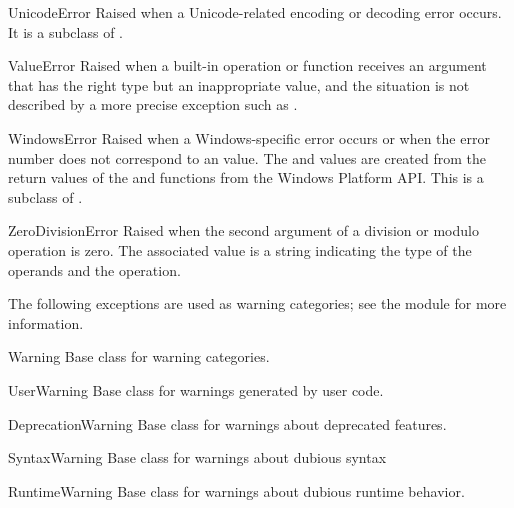 \begin{excdesc}{UnicodeError}
  Raised when a Unicode-related encoding or decoding error occurs.  It
  is a subclass of .
\end{excdesc}

\begin{excdesc}{ValueError}
  Raised when a built-in operation or function receives an argument
  that has the right type but an inappropriate value, and the
  situation is not described by a more precise exception such as
  .
\end{excdesc}

\begin{excdesc}{WindowsError}
  Raised when a Windows-specific error occurs or when the error number
  does not correspond to an  value.  The
   and  values are created from the
  return values of the  and
   functions from the Windows Platform API.
  This is a subclass of .
\end{excdesc}

\begin{excdesc}{ZeroDivisionError}
  Raised when the second argument of a division or modulo operation is
  zero.  The associated value is a string indicating the type of the
  operands and the operation.
\end{excdesc}



The following exceptions are used as warning categories; see the
 module for more information.

\begin{excdesc}{Warning}
Base class for warning categories.
\end{excdesc}

\begin{excdesc}{UserWarning}
Base class for warnings generated by user code.
\end{excdesc}

\begin{excdesc}{DeprecationWarning}
Base class for warnings about deprecated features.
\end{excdesc}

\begin{excdesc}{SyntaxWarning}
Base class for warnings about dubious syntax
\end{excdesc}

\begin{excdesc}{RuntimeWarning}
Base class for warnings about dubious runtime behavior.
\end{excdesc}
